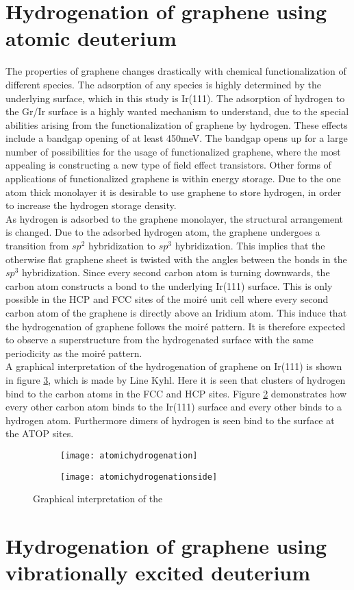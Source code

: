 \section{Hydrogenation of graphene using atomic deuterium}

The properties of graphene changes drastically with chemical functionalization of different species. The adsorption of any species is highly determined by the underlying surface, which in this study is Ir(111). The adsorption of hydrogen to the Gr/Ir surface is a highly wanted mechanism to understand, due to the special abilities arising from the functionalization of graphene by hydrogen. These effects include a bandgap opening of at least 450meV.\cite{e40134a5a1aa4cb69ba806c02cd8e327} The bandgap opens up for a large number of possibilities for the usage of functionalized graphene, where the most appealing is constructing a new type of field effect transistors. Other forms of applications of functionalized graphene is within energy storage. Due to the one atom thick monolayer it is desirable to use graphene to store hydrogen, in order to increase the hydrogen storage density.\\
As hydrogen is adsorbed to the graphene monolayer, the structural arrangement is changed. Due to the adsorbed hydrogen atom, the graphene undergoes a transition from $sp^2$ hybridization to $sp^3$ hybridization. This implies that the otherwise flat graphene sheet is twisted with the angles between the bonds in the $sp^3$ hybridization. Since every second carbon atom is turning downwards, the carbon atom constructs a bond to the underlying Ir(111) surface. This is only possible in the HCP and FCC sites of the moiré unit cell where every second carbon atom of the graphene is directly above an Iridium atom. This induce that the hydrogenation of graphene follows the moiré pattern.\cite{PhysRevB.93.115403} It is therefore expected to observe a superstructure from the hydrogenated surface with the same periodicity as the moiré pattern.\\
A graphical interpretation of the hydrogenation of graphene on Ir(111) is shown in figure \ref{hydrogenation:all}, which is made by Line Kyhl. Here it is seen that clusters of hydrogen bind to the carbon atoms in the FCC and HCP sites. Figure \ref{hydrogenationside} demonstrates how every other carbon atom binds to the Ir(111) surface and every other binds to a hydrogen atom. Furthermore dimers of hydrogen is seen bind to the surface at the ATOP sites. 

\begin{figure}
  \centering
  \begin{subfigure}[b]{0.3\textwidth}
       \texttt{[image: atomichydrogenation]}
       \caption{}
       \label{hydrogenation}
   \end{subfigure}
   \begin{subfigure}[b]{0.3\textwidth}
        \texttt{[image: atomichydrogenationside]}
        \caption{}
        \label{hydrogenationside}
    \end{subfigure}
  \caption{Graphical interpretation of the }
  \label{hydrogenation:all}
\end{figure}



\section{Hydrogenation of graphene using vibrationally excited deuterium}
